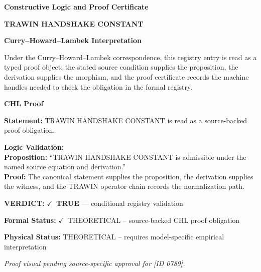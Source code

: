\clearpage
\begingroup\tzpsupportsetup
\noindent\textbf{\fontsize{10.8pt}{12.8pt}\selectfont [ID 0789] Constructive Logic and Proof Certificate}\par
\noindent\textbf{\fontsize{10pt}{12pt}\selectfont TRAWIN HANDSHAKE CONSTANT}\par
\vspace{0.45em}
\begingroup
\footnotesize
\setlength{\parskip}{0.22em}
\setlength{\parindent}{0pt}
\noindent\textbf{Curry--Howard--Lambek Interpretation}\par
Under the Curry--Howard--Lambek correspondence, this registry entry is read as a typed proof
object: the stated source condition supplies the proposition, the derivation supplies the
morphism, and the proof certificate records the machine handles needed to check the obligation
in the formal registry.

\vspace{0.45em}
\noindent\textbf{CHL Proof}\par
\textbf{Statement:} TRAWIN HANDSHAKE CONSTANT is read as a source-backed proof obligation.

\textbf{Logic Validation:}\\
\textbf{Proposition:} ``TRAWIN HANDSHAKE CONSTANT is admissible under the named source equation and derivation.''\\
\textbf{Proof:} The canonical statement supplies the proposition, the derivation supplies the witness, and the TRAWIN operator chain records the normalization path.

\textbf{VERDICT:} \ensuremath{\checkmark}\ \textbf{TRUE} --- conditional registry validation

\textbf{Formal Status:} \ensuremath{\checkmark}\ THEORETICAL -- source-backed CHL proof obligation

\textbf{Physical Status:} THEORETICAL -- requires model-specific empirical interpretation
\par\vspace{0.45em}
\par
\vfill
\begingroup\footnotesize\itshape
Proof visual pending source-specific approval for [ID 0789].
\par\endgroup
\vfill
\endgroup
\endgroup
